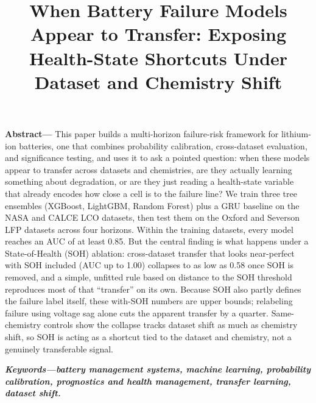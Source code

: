 \documentclass[conference]{IEEEtran}
\begin{document}
\title{When Battery Failure Models Appear to Transfer: Exposing Health-State Shortcuts Under Dataset and Chemistry Shift}

\maketitle

\noindent\textbf{Abstract---}
This paper builds a multi-horizon failure-risk framework for
lithium-ion batteries, one that combines probability calibration,
cross-dataset evaluation, and significance testing, and uses it to ask
a pointed question: when these models appear to transfer across
datasets and chemistries, are they actually learning something about
degradation, or are they just reading a health-state variable that
already encodes how close a cell is to the failure line? We train
three tree ensembles (XGBoost, LightGBM, Random Forest) plus a GRU
baseline on the NASA and CALCE LCO datasets, then test them on the
Oxford and Severson LFP datasets across four horizons. Within the
training datasets, every model reaches an AUC of at least 0.85. But
the central finding is what happens under a State-of-Health (SOH)
ablation: cross-dataset transfer that looks near-perfect with SOH
included (AUC up to 1.00) collapses to as low as 0.58 once SOH is
removed, and a simple, unfitted rule based on distance to the SOH
threshold reproduces most of that ``transfer'' on its own. Because SOH
also partly defines the failure label itself, these with-SOH numbers
are upper bounds; relabeling failure using voltage sag alone cuts the
apparent transfer by a quarter. Same-chemistry controls show the
collapse tracks dataset shift as much as chemistry shift, so SOH is
acting as a shortcut tied to the dataset and chemistry, not a
genuinely transferable signal.



\noindent\textbf{\textit{Keywords---battery management
systems, machine learning, probability calibration, prognostics and
health management, transfer learning, dataset shift.}}
\end{document}
